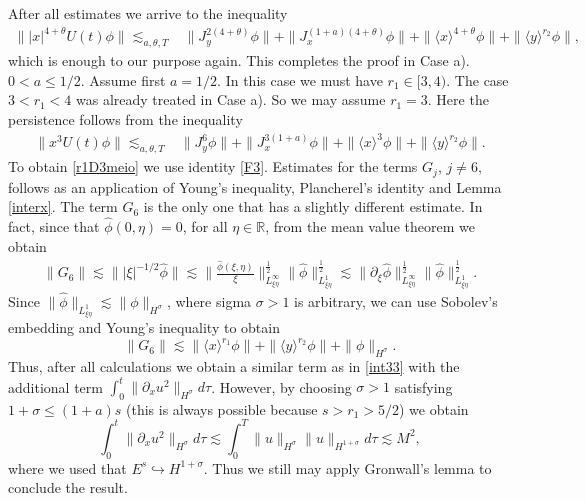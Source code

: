 \documentclass[reqno]{amsart}
\newcommand{\ha}{\hat{\phi}}
\newcommand{\les}{\lesssim}
\newcommand{\lanx}{\langle x \rangle}
\newcommand{\lany}{\langle y \rangle}
\newcommand{\R}{\mathbb R}
\newcommand{\p}{\partial}
\numberwithin{equation}{section}
\begin{document}
After all estimates we arrive to the inequality
\begin{equation*}
\begin{split}\label{psi4}
\||x|^{4+\theta}U(t)\phi\|\lesssim_{a,\theta,T}& \|J_y^{2(4+\theta)}\phi\|+\|J_x^{(1+a)(4+\theta)}\phi\|+\|\lanx^{4+\theta}\phi\|+\|\lany^{r_2}\phi\|,
\end{split}
\end{equation*}
which is enough to our purpose again. This completes the proof in Case a).\\
























 $0<a\leq 1/2$. Assume first  $a=1/2$. In this case we must have $r_1\in[3,4)$. The case $3<r_1<4$ was already treated in Case a). So we may assume $r_1=3$. Here the persistence follows from the inequality
\begin{equation}
\begin{split}\label{r1D3meio}
\|x^{3}U(t)\phi\|\lesssim_{a,\theta,T}& \|J_y^{6}\phi\|+\|J_x^{3(1+a)}\phi\|+\|\lanx^{3}\phi\|+\|\lany^{r_2}\phi\|.
\end{split}
\end{equation}
To obtain \eqref{r1D3meio} we  use identity \eqref{F3}. Estimates for the terms $G_j$, $j\neq 6$, follows as an application of Young's inequality, Plancherel's identity and Lemma \ref{interx}. The term $G_6$ is the only one that has a slightly different estimate. In fact, since that $\ha(0,\eta)=0$, for all $\eta\in \R$, from the mean value theorem we obtain   
\begin{equation}
\begin{split}\label{G6}
\|G_{6}\|\les \||\xi|^{-1/2}\hat \phi\|
\les \Big\|\frac{\ha(\xi,\eta) }{\xi}\Big\|_{L^\infty_{\xi\eta}}^{\frac{1}{2}}\|\hat\phi\|_{L^1_{\xi\eta}}^{\frac{1}{2}}
\les\|\p_\xi\ha\|_{L^\infty_{\xi\eta}}^{\frac{1}{2}}\|\hat\phi\|_{L^1_{\xi\eta}}^{\frac{1}{2}}.
\end{split}
\end{equation}
Since $\|\hat{\phi}\|_{L^1_{\xi\eta}}\lesssim \|\phi\|_{H^\sigma}$, where sigma $\sigma>1$ is arbitrary, we can use Sobolev's embedding and Young's inequality to obtain
$$
\|G_6\|\lesssim \|\lanx^{r_1}\phi\|+\|\lany^{r_2}\phi\|+\|\phi\|_{H^\sigma}.
$$
Thus, after all calculations we obtain a similar term as in \eqref{int33} with the additional term $\int_0^t\|\p_xu^2\|_{H^\sigma}d\tau$. However, by choosing $\sigma>1$ satisfying $1+\sigma\leq (1+a)s$ (this is always possible because $s>r_1>5/2$) we obtain
$$
\int_0^t\|\p_xu^2\|_{H^\sigma}d\tau\lesssim \int_0^T\|u\|_{H^\sigma}\|u\|_{H^{1+\sigma}}d\tau\lesssim M^2,
$$
where we used that $E^s\hookrightarrow H^{1+\sigma}$. Thus we still may apply Gronwall's lemma to conclude the result.
\end{document}
